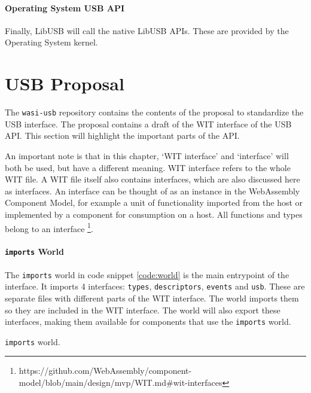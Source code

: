\paragraph{Operating System USB API} Finally, LibUSB will call the native LibUSB APIs. These are provided by the Operating System kernel.

\section{USB Proposal}
\label{section:usb_proposal}
The \texttt{wasi-usb} repository \cite{wasi_usb} contains the contents of the proposal to standardize the USB interface. The proposal contains a draft of the \acrshort{WIT} interface of the USB API. This section will highlight the important parts of the API.

An important note is that in this chapter, `WIT interface' and `interface' will both be used, but have a different meaning.
WIT interface refers to the whole WIT file.
A WIT file itself also contains interfaces, which are also discussed here as interfaces. An interface can be thought of as an instance in the WebAssembly Component Model, for example a unit of functionality imported from the host or implemented by a component for consumption on a host. All functions and types belong to an interface \footnote{https://github.com/WebAssembly/component-model/blob/main/design/mvp/WIT.md\#wit-interfaces}.

\paragraph{\texttt{imports} World}
The \texttt{imports} world in code snippet \ref{code:world} is the main entrypoint of the interface. It imports 4 interfaces: \texttt{types}, \texttt{descriptors}, \texttt{events} and \texttt{usb}. These are separate files with different parts of the WIT interface. The world imports them so they are included in the WIT interface. The world will also export these interfaces, making them available for components that use the \texttt{imports} world.\\

\begin{code}

\caption{\texttt{imports} world.}
\label{code:world}
\end{code}

